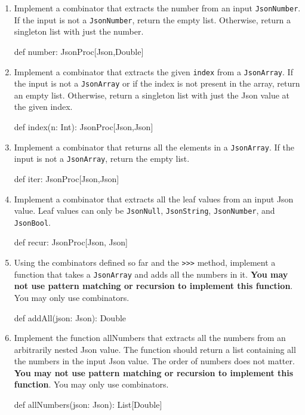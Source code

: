 \documentclass[9pt]{extbook}
\begin{document}
\begin{enumerate}
    \item Implement a combinator that extracts the number from an input
    \texttt{JsonNumber}. If the input is not a \texttt{JsonNumber}, return the
    empty list. Otherwise, return a singleton list with just the number.
    \begin{scalacode}
    def number: JsonProc[Json,Double]
    \end{scalacode}

    \item Implement a combinator that extracts the given \texttt{index} from
    a \texttt{JsonArray}. If the input is not a \texttt{JsonArray} or if the index
    is not present in the array, return an empty list. Otherwise, return
    a singleton list with just the Json value at the given index.
    \begin{scalacode}
    def index(n: Int): JsonProc[Json,Json]
    \end{scalacode}

    \item Implement a combinator that returns all the elements in a
    \texttt{JsonArray}. If the input is not a \texttt{JsonArray}, return the
    empty list.
    \begin{scalacode}
    def iter: JsonProc[Json,Json]
    \end{scalacode}

    \item Implement a combinator that extracts all the leaf values from an
    input Json value. Leaf values can only be \texttt{JsonNull},
    \texttt{JsonString}, \texttt{JsonNumber}, and \texttt{JsonBool}.
    \begin{scalacode}
    def recur: JsonProc[Json, Json]
    \end{scalacode}

    \item Using the combinators defined so far and the \texttt{>>>} method,
    implement a function that takes a \texttt{JsonArray} and adds all the
    numbers in it. \textbf{You may not use pattern matching or recursion to
    implement this function}. You may only use combinators.
    \begin{scalacode}
    def addAll(json: Json): Double
    \end{scalacode}

    \item Implement the function allNumbers that extracts all the numbers from
    an arbitrarily nested Json value. The function should return a list containing
    all the numbers in the input Json value. The order of numbers does not
    matter. \textbf{You may not use pattern matching or recursion to
    implement this function}. You may only use
    combinators.
    \begin{scalacode}
    def allNumbers(json: Json): List[Double]
    \end{scalacode}


\end{enumerate}
\end{document}
